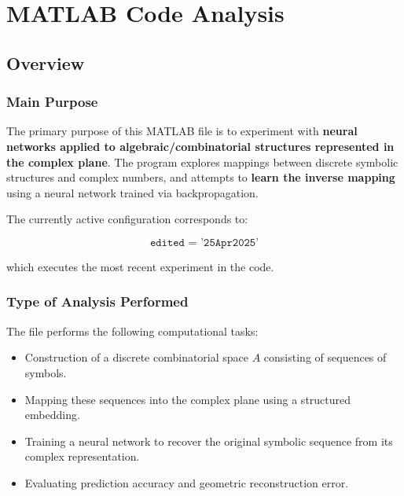 
\chapter{MATLAB Code Analysis}
\author{Expert Software Engineer}
\date{}


\maketitle

\section{Overview}

\subsection{Main Purpose}

The primary purpose of this MATLAB file is to experiment with \textbf{neural networks applied to algebraic/combinatorial structures represented in the complex plane}. The program explores mappings between discrete symbolic structures and complex numbers, and attempts to \textbf{learn the inverse mapping} using a neural network trained via backpropagation.

The currently active configuration corresponds to:

\[
\texttt{edited = '25Apr2025'}
\]

which executes the most recent experiment in the code.

\subsection{Type of Analysis Performed}

The file performs the following computational tasks:

\begin{itemize}
\item Construction of a discrete combinatorial space \(A\) consisting of sequences of symbols.
\item Mapping these sequences into the complex plane using a structured embedding.
\item Training a neural network to recover the original symbolic sequence from its complex representation.
\item Evaluating prediction accuracy and geometric reconstruction error.
\end{itemize}

